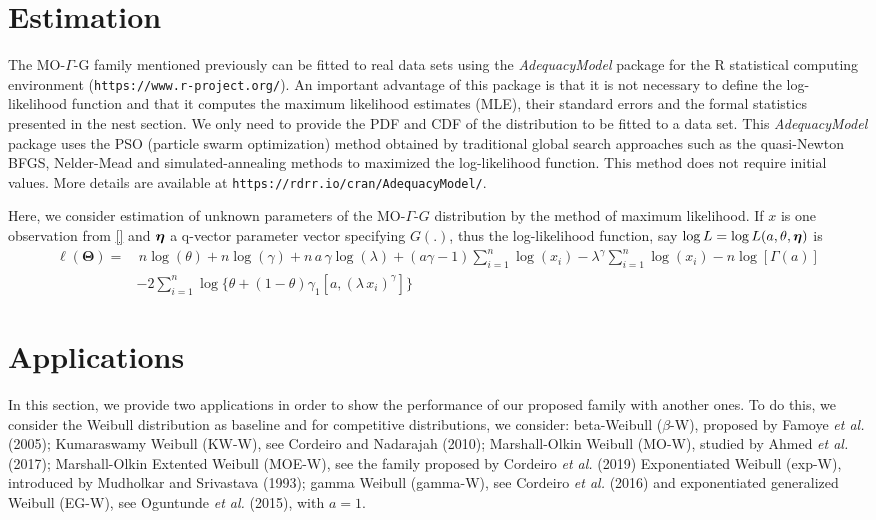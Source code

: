 \documentclass[12pt,a4paper]{article} %
\newcommand{\etn}{{\mbox{\boldmath $\eta$}}}
\begin{document}
\section{Estimation}\label{estimation}

The  MO-$\Gamma$-G family mentioned previously can be  fitted to real data sets using the {\it AdequacyModel}
package for the {\sf R} statistical computing environment ({\tt https://www.r-project.org/}).
An important advantage of this packa\-ge is that it is not necessary to define
the log-likelihood function and that it computes the maximum likelihood estimates (MLE), their standard errors and the formal statistics
presented in the nest section. We only need to provide the PDF and CDF of the distribution to be fitted to a data set.
This {\it AdequacyModel} package uses the PSO (particle swarm optimization) method obtained by traditional global search approaches
such as the quasi-Newton BFGS, Nelder-Mead and simulated-annealing methods to maximized the log-likelihood function. This
method does not require initial values. More
details are available at {\tt https://rdrr.io/cran/AdequacyModel/}.

Here, we consider estimation of unknown parameters of the MO-$\Gamma$-$G$ distribution by the method of maximum likelihood. If $x$ is one observation from \ref{} and $\etn$ a q-vector parameter vector specifying $G(.)$, thus the log-likelihood function, say $\log L=\log L(a,\theta,\etn)$ is
\begin{align}\ell (\boldsymbol{\Theta})=&\,n\log (\theta)+n\log(\gamma)+n\, a\, \gamma \log(\lambda)+(a\gamma-1)\sum_{i=1}^n{\log(x_i)}-\lambda^\gamma\sum_{i=1}^n{\log(x_i)}-n\log[\Gamma(a)] \nonumber \\ & -2\sum_{i=1}^n{\log\{\theta+(1-\theta)\gamma_1[a,(\lambda\,x_i)^\gamma]\}}
\end{align}


\section{Applications}\label{applications}

In this section, we provide two applications in order to show the performance of our proposed family with another ones. To do this, we consider the Weibull distribution as baseline and for competitive distributions, we consider: beta-Weibull ($\beta$-W), proposed by Famoye {\it et al.} (2005); Kumaraswamy Weibull (KW-W), see Cordeiro and Nadarajah (2010); Marshall-Olkin Weibull (MO-W), studied by Ahmed {\it et al.} (2017); Marshall-Olkin Extented Weibull (MOE-W), see the family proposed by Cordeiro {\it et al.} (2019)
Exponentiated Weibull (exp-W), introduced by Mudholkar and Srivastava (1993); gamma Weibull (gamma-W), see Cordeiro {\it et al.} (2016) and exponentiated generalized Weibull (EG-W), see Oguntunde {\it et al.} (2015), with $a=1$.
\end{document}
